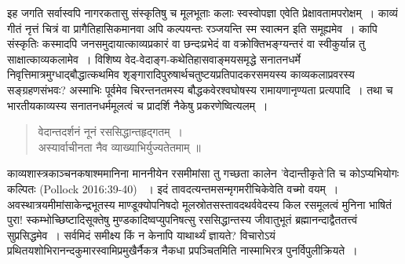 {\dev इह जगति सर्वास्वपि नागरकतासु संस्कृतिषु च मूलभूताः कलाः स्वस्वोपज्ञा एवेति प्रेक्षावता\-मपरोक्षम्~। काव्यं गीतं नृत्तं चित्रं वा प्रागैतिहासिकमानवा अपि कल्पयन्तः रञ्जयन्ति स्म स्वात्मन इति समूह्यमेव~। कापि संस्कृतिः कस्मादपि जनसमुदायात्काव्यप्रकारं वा छन्दःप्रभेदं वा वक्रोक्तिभङ्ग्यन्तरं वा स्वीकुर्यान्न तु साक्षात्काव्यकलामेव~। विशिष्य वेद-वेदाङ्ग-कथेतिहास\-वाङ्मयसमृद्धे सनातनधर्मे निवृत्तिमात्रमुग्धाद्बौद्धात्कथमिव शृङ्गारादिपुरुषार्थचतुष्टयप्रतिपाद\-करसमयस्य काव्यकलाप्रवरस्य सङ्ग्रहणसंभवः? अस्माभिः पूर्वमेव चिरन्तनतमस्य बौद्ध\-कवेरश्वघोषस्य रामायणानृण्यता प्रत्यपादि~। तथा च भारतीयकाव्यस्य सनातनधर्ममूलत्वं च प्रादर्शि नैकेषु प्रकरणेष्वित्यलम्~।}  
\begin{quote}
{\dev वेदान्तदर्शनं नूनं रससिद्धान्तहृद्गतम्~।}\\
{\dev अस्यार्वाचीनता नैव व्याख्याभिर्युज्यतेतमाम् ॥}
\end{quote}

{\dev काव्यशास्त्रकाञ्चनकषाश्ममानिना माननीयेन रसमीमांसा तु गच्छता कालेन ’वेदान्तीकृते’ति च कोऽप्यभियोगः कल्पितः} (Pollock 2016:39-40) {\dev~। इदं तावदत्यन्तमसन्मृगमरीचि\-केवेति वच्मो वयम्~। अवस्थात्रयमीमांसाकेन्द्रभूतस्य माण्डूक्योपनिषदो मूलस्रोतसस्तावद\-थर्ववेदस्य किल रसमूलत्वं मुनिना भाषितं पुरा! स्कम्भोच्छिष्टादिसूक्तेषु मुण्डकादिष्वप्युपनि\-षत्सु रस\-सिद्धान्तस्य जीवातुभूतं ब्रह्मानन्दाद्वैततत्त्वं सुप्रसिद्धमेव~। सर्वमिदं समीक्ष्य किं न केनापि याथार्थ्यं ज्ञायते? विचारोऽयं प्रथितयशोभिरानन्दकुमारस्वामिप्रमुखैर्नैकत्र नैकधा प्रपञ्चितमिति नास्माभिरत्र पुनर्विपुलीक्रियते~।}   

